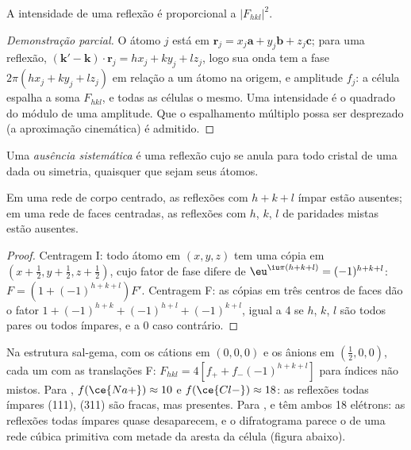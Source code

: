 \begin{proposition}[Intensidade]\label{prop:b3:x-ray-diffraction:intensity}
A intensidade de uma reflexão é proporcional a $|F_{hkl}|^2$.
\end{proposition}

\begin{proof}[Demonstração parcial]
O átomo $j$ está em $\mathbf r_j = x_j\mathbf a + y_j\mathbf b + z_j\mathbf c$; para uma reflexão,
$(\mathbf k' - \mathbf k)\cdot\mathbf r_j = hx_j + ky_j + lz_j$, logo sua onda tem a fase
$2\pi(hx_j + ky_j + lz_j)$ em relação a um átomo na origem, e amplitude $f_j$:
a célula espalha a soma $F_{hkl}$, e todas as células o mesmo. Uma intensidade é o
quadrado do módulo de uma amplitude. Que o espalhamento múltiplo possa ser
desprezado (a aproximação cinemática) é admitido.
\end{proof}

\begin{definition}\label{def:b3:x-ray-diffraction:absence}
Uma \emph{ausência sistemática} é uma reflexão cujo
 se anula para todo cristal de uma dada  ou
simetria, quaisquer que sejam seus átomos.
\end{definition}

\begin{proposition}\label{prop:b3:x-ray-diffraction:absences}
Em uma rede de corpo centrado, as reflexões com $h + k + l$ ímpar estão ausentes; em
uma rede de faces centradas, as reflexões com $h$, $k$, $l$ de paridades mistas estão ausentes.
\end{proposition}

\begin{proof}
Centragem I: todo átomo em $(x,y,z)$ tem uma cópia em $(x + \frac12, y + \frac12, z + \frac12)$,
cujo fator de fase difere de $\eu^{\iu\pi(h+k+l)} = (-1)^{h+k+l}$: $F = (1 +
(-1)^{h+k+l})F'$. Centragem F: as cópias em três centros de faces dão o fator $1 +
(-1)^{h+k} + (-1)^{h+l} + (-1)^{k+l}$, igual a 4 se $h$, $k$, $l$ são todos pares ou todos
ímpares, e a 0 caso contrário.
\end{proof}

\begin{example}\label{ex:b3:x-ray-diffraction:nacl-kcl}
Na estrutura sal-gema, com os cátions em $(0,0,0)$ e os ânions em $(\frac12,0,0)$, cada um
com as translações F: $F_{hkl} = 4[f_+ + f_-(-1)^{h+k+l}]$ para índices não mistos.
Para , $f(\ce{Na+}) \approx 10$ e $f(\ce{Cl-}) \approx 18$: as reflexões todas ímpares
(111), (311) são fracas, mas presentes. Para ,  e  têm ambos 18
elétrons: as reflexões todas ímpares quase desaparecem, e o difratograma parece
o de uma rede cúbica primitiva com metade da aresta da célula (figura abaixo).
\end{example}

